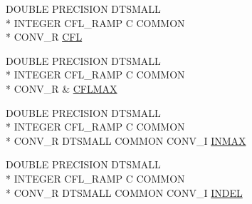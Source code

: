 \begin{DoxyCompactItemize}
\item 
D\-O\-U\-B\-L\-E P\-R\-E\-C\-I\-S\-I\-O\-N D\-T\-S\-M\-A\-L\-L \\*
I\-N\-T\-E\-G\-E\-R C\-F\-L\-\_\-\-R\-A\-M\-P C C\-O\-M\-M\-O\-N \\*
C\-O\-N\-V\-\_\-\-R \hyperlink{home_2abonfi_2_c_f_d__codes_2_eul_f_s_83_84_2include_2conv_8com_abba4cd7448a713602f433783798bc49f}{C\-F\-L}
\item 
D\-O\-U\-B\-L\-E P\-R\-E\-C\-I\-S\-I\-O\-N D\-T\-S\-M\-A\-L\-L \\*
I\-N\-T\-E\-G\-E\-R C\-F\-L\-\_\-\-R\-A\-M\-P C C\-O\-M\-M\-O\-N \\*
C\-O\-N\-V\-\_\-\-R \& \hyperlink{home_2abonfi_2_c_f_d__codes_2_eul_f_s_83_84_2include_2conv_8com_acefea3b10cf227cfbe18a5ae682cda07}{C\-F\-L\-M\-A\-X}
\item 
D\-O\-U\-B\-L\-E P\-R\-E\-C\-I\-S\-I\-O\-N D\-T\-S\-M\-A\-L\-L \\*
I\-N\-T\-E\-G\-E\-R C\-F\-L\-\_\-\-R\-A\-M\-P C C\-O\-M\-M\-O\-N \\*
C\-O\-N\-V\-\_\-\-R D\-T\-S\-M\-A\-L\-L C\-O\-M\-M\-O\-N C\-O\-N\-V\-\_\-\-I \hyperlink{home_2abonfi_2_c_f_d__codes_2_eul_f_s_83_84_2include_2conv_8com_ae1a2f506c87687fe1a93649abac3846a}{I\-N\-M\-A\-X}
\item 
D\-O\-U\-B\-L\-E P\-R\-E\-C\-I\-S\-I\-O\-N D\-T\-S\-M\-A\-L\-L \\*
I\-N\-T\-E\-G\-E\-R C\-F\-L\-\_\-\-R\-A\-M\-P C C\-O\-M\-M\-O\-N \\*
C\-O\-N\-V\-\_\-\-R D\-T\-S\-M\-A\-L\-L C\-O\-M\-M\-O\-N C\-O\-N\-V\-\_\-\-I \hyperlink{home_2abonfi_2_c_f_d__codes_2_eul_f_s_83_84_2include_2conv_8com_af687d75faa87ba22ebd22f23d1d75cf2}{I\-N\-D\-E\-L}
\end{DoxyCompactItemize}


